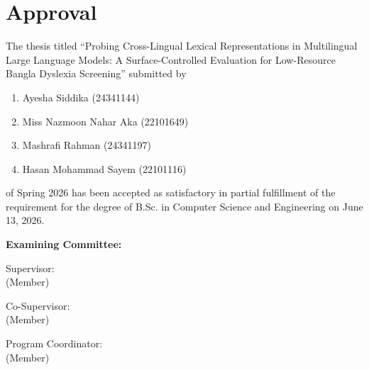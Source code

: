 \section*{Approval}

The thesis titled ``Probing Cross-Lingual Lexical Representations in Multilingual Large Language Models: A Surface-Controlled Evaluation for Low-Resource Bangla Dyslexia Screening'' submitted by
\begin{enumerate}
  \item Ayesha Siddika (24341144)
  \item Miss Nazmoon Nahar Aka (22101649)
  \item Mashrafi Rahman (24341197)
  \item Hasan Mohammad Sayem (22101116)
\end{enumerate}

of Spring 2026 has been accepted as satisfactory in partial fulfillment of the requirement for the degree of B.Sc. in Computer Science and Engineering on June 13, 2026.

\vspace{0.5cm}
\textbf{Examining Committee:}

\vspace{1cm}

Supervisor:\\
(Member)
\begin{center}
    \hspace{7cm}  \hspace{1cm}
\end{center}

Co-Supervisor:\\
(Member)
\begin{center}
    \hspace{7cm}  \hspace{1cm}
\end{center}
\newpage
Program Coordinator:\\
(Member)
\begin{center}
    \hspace{7cm}  \hspace{1cm}
\end{center}


